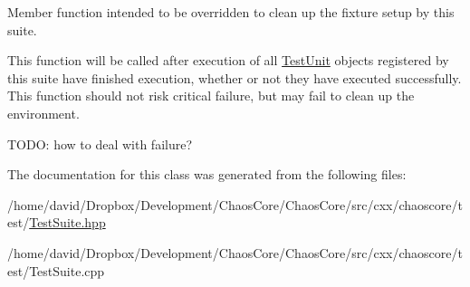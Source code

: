 Member function intended to be overridden to clean up the fixture setup by this suite. 

This function will be called after execution of all \hyperlink{classchaos_1_1test_1_1_test_unit}{Test\-Unit} objects registered by this suite have finished execution, whether or not they have executed successfully. This function should not risk critical failure, but may fail to clean up the environment.

T\-O\-D\-O\-: how to deal with failure? 

The documentation for this class was generated from the following files\-:\begin{DoxyCompactItemize}
\item 
/home/david/\-Dropbox/\-Development/\-Chaos\-Core/\-Chaos\-Core/src/cxx/chaoscore/test/\hyperlink{_test_suite_8hpp}{Test\-Suite.\-hpp}\item 
/home/david/\-Dropbox/\-Development/\-Chaos\-Core/\-Chaos\-Core/src/cxx/chaoscore/test/Test\-Suite.\-cpp\end{DoxyCompactItemize}
